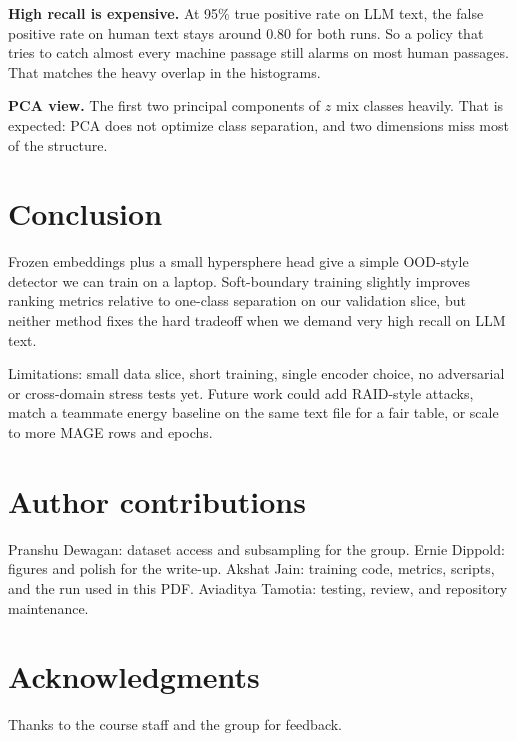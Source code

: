 \documentclass[11pt]{article}
\begin{document}
\textbf{High recall is expensive.}
At 95\% true positive rate on LLM text, the false positive rate on human text stays around 0.80 for both runs.
So a policy that tries to catch almost every machine passage still alarms on most human passages.
That matches the heavy overlap in the histograms.

\textbf{PCA view.}
The first two principal components of $z$ mix classes heavily.
That is expected: PCA does not optimize class separation, and two dimensions miss most of the structure.

\section{Conclusion}
Frozen embeddings plus a small hypersphere head give a simple OOD-style detector we can train on a laptop.
Soft-boundary training slightly improves ranking metrics relative to one-class separation on our validation slice, but neither method fixes the hard tradeoff when we demand very high recall on LLM text.

Limitations: small data slice, short training, single encoder choice, no adversarial or cross-domain stress tests yet.
Future work could add RAID-style attacks, match a teammate energy baseline on the same text file for a fair table, or scale to more MAGE rows and epochs.

\section*{Author contributions}
Pranshu Dewagan: dataset access and subsampling for the group.
Ernie Dippold: figures and polish for the write-up.
Akshat Jain: training code, metrics, scripts, and the run used in this PDF.
Aviaditya Tamotia: testing, review, and repository maintenance.

\section*{Acknowledgments}
Thanks to the course staff and the group for feedback.


\end{document}
